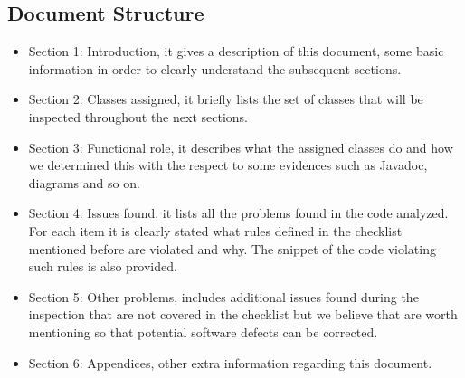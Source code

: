 \subsection{Document Structure}
\begin{itemize}
	\item Section 1: Introduction, it gives a description of this document, some basic information in order to clearly understand the subsequent sections.
	\item Section 2: Classes assigned, it briefly lists the set of classes that will be inspected throughout the next sections.
	\item Section 3: Functional role, it describes what the assigned classes do and how we determined this with the respect to some evidences such as Javadoc, diagrams and so on.
	\item Section 4: Issues found, it lists all the problems found in the code analyzed. For each item it is clearly stated what rules defined in the checklist mentioned before are violated and why. The snippet of the code violating such rules is also provided.
	\item Section 5: Other problems, includes additional issues found during the inspection that are not covered in the checklist but we believe that are worth mentioning so that potential software defects can be corrected.
	\item Section 6: Appendices, other extra information regarding this document. 
\end{itemize}
